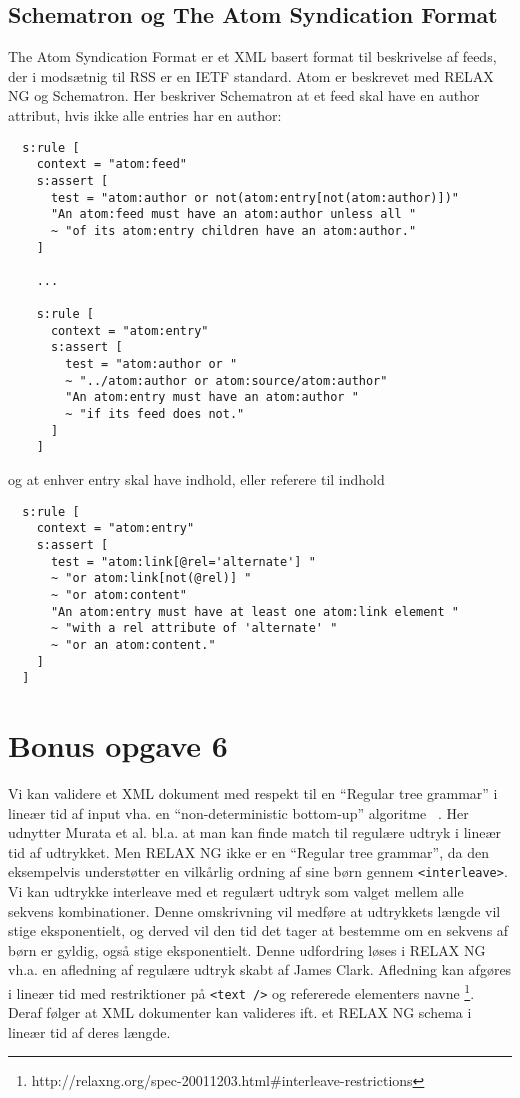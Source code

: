 \documentclass[a4paper,10pt]{article}
\begin{document}
\subsection*{Schematron og The Atom Syndication Format}
The Atom Syndication Format er et XML basert format til beskrivelse af feeds, der i modsætnig til RSS er en IETF standard.  Atom er beskrevet med RELAX NG og Schematron. Her beskriver Schematron at et feed skal have en author attribut, hvis ikke alle entries har en author: 
\begin{lstlisting}
  s:rule [
    context = "atom:feed"
    s:assert [
      test = "atom:author or not(atom:entry[not(atom:author)])"
      "An atom:feed must have an atom:author unless all "
      ~ "of its atom:entry children have an atom:author."
    ]

    ...
    
    s:rule [
      context = "atom:entry"
      s:assert [
        test = "atom:author or "
        ~ "../atom:author or atom:source/atom:author"
        "An atom:entry must have an atom:author "
        ~ "if its feed does not."
      ]
    ]
\end{lstlisting}
og at enhver entry skal have indhold, eller referere til indhold
\begin{lstlisting}
  s:rule [
    context = "atom:entry"
    s:assert [
      test = "atom:link[@rel='alternate'] "
      ~ "or atom:link[not(@rel)] "
      ~ "or atom:content"
      "An atom:entry must have at least one atom:link element "
      ~ "with a rel attribute of 'alternate' "
      ~ "or an atom:content."
    ]
  ]
\end{lstlisting}

\section*{Bonus opgave 6}
Vi kan validere et XML dokument med respekt til en ``Regular tree grammar'' i lineær tid af input vha. en ``non-deterministic bottom-up'' algoritme  ~\cite[s. 12]{Murata00taxonomyof}. Her udnytter Murata et al.  bl.a. at man kan finde match til regulære udtryk i lineær tid af udtrykket. Men RELAX NG ikke er en ``Regular tree grammar'', da den eksempelvis understøtter en vilkårlig ordning af sine børn gennem \texttt{<interleave>}. Vi kan udtrykke interleave med et regulært udtryk som valget mellem alle sekvens kombinationer. Denne omskrivning vil medføre at udtrykkets længde vil stige eksponentielt, og derved vil den tid det tager at bestemme om en sekvens af børn er gyldig, også stige eksponentielt. Denne udfordring løses i RELAX NG vh.a. en afledning af regulære udtryk skabt af James Clark. Afledning kan afgøres i lineær tid med restriktioner på \texttt{<text />} og refererede elementers navne \footnote{http://relaxng.org/spec-20011203.html\#interleave-restrictions}. Deraf følger at XML dokumenter kan valideres ift. et RELAX NG schema i lineær tid af deres længde. 


{}
 
\end{document}
